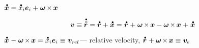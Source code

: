 \begin{otherlanguage}{russian}
${
\mathdotabove{\bm{x}} = \mathdotabove{x}_i \bm{e}_i + \hspace{.1ex} \bm{\omega} \hspace{-0.16ex} \times \hspace{-0.16ex} \bm{x}
}$

\begin{equation*}
\bm{v} \equiv \hspace{-0.1ex} \mathdotabove{\initiallocationvector} = \mathdotabove{\locationvector} + \mathdotabove{\bm{x}}
= \hspace{-0.2ex} \tikzmark{beginEVelocity} \hspace{.25ex} \mathdotabove{\locationvector} \hspace{.1ex} + \hspace{.1ex} \bm{\omega} \hspace{-0.2ex} \times \hspace{-0.2ex} \bm{x} \tikzmark{endEVelocity}
\hspace{.4ex} \tikzmark{beginRelativeVelocity} \hspace{-0.4ex} - \bm{\omega} \hspace{-0.2ex} \times \hspace{-0.2ex} \bm{x} \hspace{.1ex} + \hspace{.1ex} \mathdotabove{\bm{x}} \hspace{-0.33ex} \tikzmark{endRelativeVelocity}
\end{equation*}%

${
\mathdotabove{\bm{x}} \hspace{.1ex} - \hspace{.1ex} \bm{\omega} \hspace{-0.2ex} \times \hspace{-0.2ex} \bm{x} = \mathdotabove{x}_i \bm{e}_i
\equiv \hspace{.1ex} \bm{v}_{r\kern-0.1exel}
}$\:--- relative velocity,
${
\mathdotabove{\locationvector} \hspace{.1ex} + \hspace{.1ex} \bm{\omega} \hspace{-0.2ex} \times \hspace{-0.2ex} \bm{x}
\equiv \hspace{.1ex} \bm{v}_{\hspace{-0.1ex}e}
}$


\end{otherlanguage}
